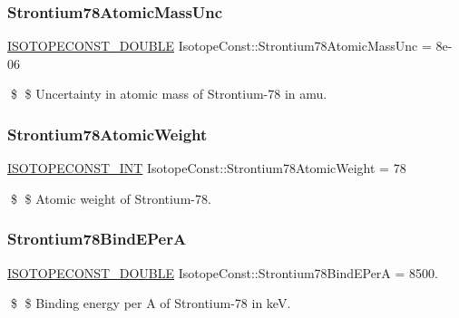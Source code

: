 \subsubsection{\texorpdfstring{Strontium78\+Atomic\+Mass\+Unc}{Strontium78AtomicMassUnc}}
{\footnotesize\ttfamily \mbox{\hyperlink{group___isotope_const-_macros_ga8f45a7272ce02c0b4c65c44636ed719a}{I\+S\+O\+T\+O\+P\+E\+C\+O\+N\+S\+T\+\_\+\+D\+O\+U\+B\+LE}} Isotope\+Const\+::\+Strontium78\+Atomic\+Mass\+Unc = 8e-\/06}

\$ \$ Uncertainty in atomic mass of Strontium-\/78 in amu. \mbox{\label{group___isotope_const-_strontium-_sr78_ga09bd745b995b47a63a5a1049d19bda21}} 
\subsubsection{\texorpdfstring{Strontium78\+Atomic\+Weight}{Strontium78AtomicWeight}}
{\footnotesize\ttfamily \mbox{\hyperlink{group___isotope_const-_macros_ga5f18360b3e99483a35c32d789e62621c}{I\+S\+O\+T\+O\+P\+E\+C\+O\+N\+S\+T\+\_\+\+I\+NT}} Isotope\+Const\+::\+Strontium78\+Atomic\+Weight = 78}

\$ \$ Atomic weight of Strontium-\/78. \mbox{\label{group___isotope_const-_strontium-_sr78_gae7b2d7b79339d30dbdbf14f112ebd5ac}} 
\subsubsection{\texorpdfstring{Strontium78\+Bind\+E\+PerA}{Strontium78BindEPerA}}
{\footnotesize\ttfamily \mbox{\hyperlink{group___isotope_const-_macros_ga8f45a7272ce02c0b4c65c44636ed719a}{I\+S\+O\+T\+O\+P\+E\+C\+O\+N\+S\+T\+\_\+\+D\+O\+U\+B\+LE}} Isotope\+Const\+::\+Strontium78\+Bind\+E\+PerA = 8500.}

\$ \$ Binding energy per A of Strontium-\/78 in keV. \mbox{\label{group___isotope_const-_strontium-_sr78_ga6de7baa98cc5b8a5410e1cff0e28cd83}} 
